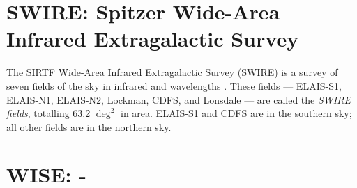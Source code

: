 
    \section{SWIRE: Spitzer Wide-Area Infrared Extragalactic Survey}
    \label{sec:swire}

        The SIRTF Wide-Area Infrared Extragalactic Survey (SWIRE) is a survey of seven fields of the sky in infrared and wavelengths \citep{lonsdale03}. These fields --- ELAIS-S1, ELAIS-N1, ELAIS-N2, Lockman, CDFS, and Lonsdale --- are called the \emph{SWIRE fields}, totalling 63.2 $\deg^2$ in area. ELAIS-S1 and CDFS are in the southern sky; all other fields are in the northern sky.

    \section{WISE: -}
    \label{sec:wise}




